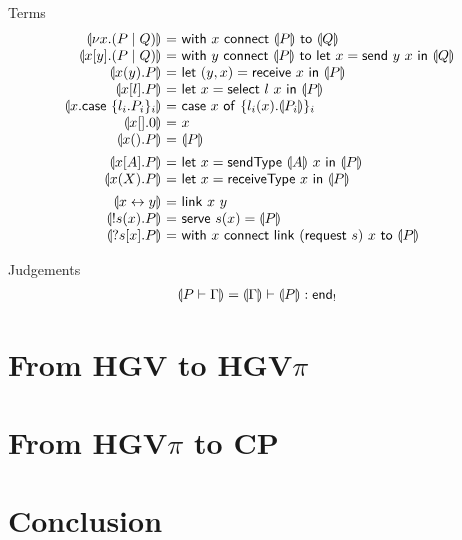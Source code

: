 \documentclass{easychair}
\makeatletter
\newcommand{\ba}{\begin{array}}
\newcommand{\ea}{\end{array}}
\newenvironment{equations}{\[\ba{@{}r@{~}c@{~}l@{}}}{\ea\]}
\newcommand{\key}{\mathsf}
\newcommand{\set}[1]{\{ #1 \}}
\newcommand{\cptogv}[1]{\llparenthesis{#1}\rrparenthesis}
\newcommand{\row}[2]{\set{#1}_{#2}}
\newcommand{\gvEndOutput}{\key{end}_!}
\newcommand{\cpj}[2]{{#1} \vdash {#2}}
\newcommand{\gvj}[3]{{#1} \vdash {#2} : {#3}}
\newcommand{\la}{l}
\newcommand{\G}{\Gamma}
\newcommand{\gvLink}[2]{\key{link}~{#1}~{#2}}
\newcommand{\gvPair}[2]{({#1},{#2})}
\newcommand{\gvLet}[3]{\key{let}~{#1}={#2}~\key{in}~{#3}}
\newcommand{\gvSend}[2]{\key{send}~{#1}~{#2}}
\newcommand{\gvReceive}[1]{\key{receive}~{#1}}
\newcommand{\gvSelect}[2]{\key{select}~{#1}~{#2}}
\newcommand{\gvCase}[2]{\key{case}~{#1}~\key{of}~{#2}}
\newcommand{\gvWith}[3]{\key{with}~{#1}~\key{connect}~{#2}~\key{to}~{#3}}
\newcommand{\gvTerminate}[1]{\key{terminate}~{#1}}
\newcommand{\gvSendType}[2]{\key{sendType}~{#1}~{#2}}
\newcommand{\gvReceiveType}[1]{\key{receiveType}~{#1}}
\newcommand{\gvServe}[3]{\key{serve}~{#1}({#2})={#3}}
\newcommand{\gvRequest}[1]{\key{request}~{#1}}
\newcommand{\cpLink}[2]{{#1} \leftrightarrow {#2}}
\newcommand{\cpCut}[3]{\nu {#1}.({#2} \mid {#3})}
\newcommand{\cpOutput}[4]{{#1}[{#2}].({#3} \mid {#4})}
\newcommand{\cpInput}[3]{{#1}({#2}).{#3}}
\newcommand{\cpInject}[3]{{#1}[{#2}].{#3}}
\newcommand{\cpCase}[2]{{#1}.\key{case}~{#2}}
\newcommand{\cpServe}[3]{!{#1}({#2}).{#3}}
\newcommand{\cpRequest}[3]{?{#1}[{#2}].{#3}}
\newcommand{\cpEmptyOut}[1]{{#1}[].0}
\newcommand{\cpEmptyIn}[2]{{#1}().{#2}}
\newcommand{\cpSendType}[3]{{#1}[{#2}].{#3}}
\newcommand{\cpReceiveType}[3]{{#1}({#2}).{#3}}
\newcommand{\hgv}{HGV\xspace}
\newcommand{\hgvpi}{HGV$\pi$\xspace}
\makeatother
\begin{document}
Terms
\begin{equations}
\cptogv{\cpCut{x}{P}{Q}} &=&
  \gvWith{x}{\cptogv{P}}{\cptogv{Q}} \\
\cptogv{\cpOutput{x}{y}{P}{Q}} &=&
  \gvWith{y}{\cptogv{P}}{\gvLet{x}{\gvSend{y}{x}}{\cptogv{Q}}} \\
\cptogv{\cpInput{x}{y}{P}} &=&
  \gvLet{\gvPair{y}{x}}{\gvReceive{x}}{\cptogv{P}} \\
\cptogv{\cpInject{x}{\la}{P}} &=&
  \gvLet{x}{\gvSelect{\la}{x}}{\cptogv{P}} \\
\cptogv{\cpCase{x}{\row{\la_i.P_i}{i}}} &=&
  \gvCase{x}{\row{\la_i(x).\cptogv{P_i}}{i}} \\
\cptogv{\cpEmptyOut{x}} &=& x \\
\cptogv{\cpEmptyIn{x}{P}} &=& \cptogv{P} \\[1ex]

\cptogv{\cpSendType{x}{A}{P}} &=&
  \gvLet{x}{\gvSendType{\cptogv{A}}{x}}{\cptogv{P}} \\
\cptogv{\cpReceiveType{x}{X}{P}} &=&
  \gvLet{x}{\gvReceiveType{x}}{\cptogv{P}} \\[1ex]

\cptogv{\cpLink{x}{y}} &=& \gvLink{x}{y} \\
\cptogv{\cpServe{s}{x}{P}} &=&
  \gvServe{s}{x}{\cptogv{P}} \\
\cptogv{\cpRequest{s}{x}{P}} &=&
  \gvWith{x}{\gvLink{(\gvRequest{s})}{x}}{\cptogv{P}} \\
\end{equations}

Judgements
\begin{equations}
\cptogv{\cpj{P}{\G}} = \gvj{\cptogv{\G}}{\cptogv{P}}{\gvEndOutput}
\end{equations}

\section{From \hgv to \hgvpi} 

\section{From \hgvpi to CP}

\section{Conclusion}
\end{document}
